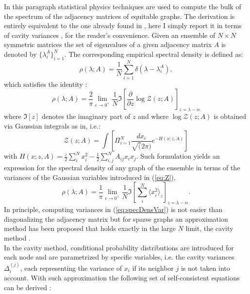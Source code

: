 \documentclass[%
 reprint,
 amsmath,amssymb,
 aps,
 pre,
 showpacs
]{revtex4-1}
\begin{document}
In this paragraph statistical physics techniques are used to compute the bulk of the spectrum of the adjacency matrices of equitable graphs. The derivation is entirely equivalent to the one already found in \cite{newman2014equitable}, here I simply report it in terms of cavity variances \cite{rogers2008cavity}, for the reader's convenience.
Given an ensemble of $N\times N$ symmetric matrices the set of eigenvalues of a given adjacency matrix $A$ is denoted by $\{\lambda_i^A\}_{i=1}^N$. The corresponding empirical spectral density is defined as:
\begin{equation}\label{eq:specDen}
\rho(\lambda;A)=\frac{1}{N}\sum_{i=1}^N\delta(\lambda-\lambda_i^A),
\end{equation}
which satisfies the identity \cite{edwards1976eigenvalue}:
\begin{equation}\label{eq:edwards}
\rho(\lambda;A)=\frac{2}{\pi}\lim_{\epsilon\rightarrow 0^+}\frac{1}{N}\Im\left[\frac{\partial}{\partial z}\log\mathcal{Z}(z;A)\right]_{z=\lambda-i\epsilon}
\end{equation}
where $\Im[z]$ denotes the imaginary part of $z$ and where $\log\mathcal{Z}(z;A)$ is obtained via Gaussian integrals as in\cite{edwards1976eigenvalue}, i.e.: 
\begin{equation}\label{eq:Z}
\mathcal{Z}(z;A)=\int \left[\Pi_{i=1}^N\frac{dx_i}{\sqrt(2\pi)} e^{-H(x;z,A)}\right]
\end{equation}
with $H(x;z,A) = \frac{z}{2}\sum_{i}^N x_i^2  -\frac{1}{2}\sum_{i,j}^N A_{ij}x_ix_j $. Such formulation yields an expression for the spectral density of any graph of the ensemble in terms of the variances of the Gaussian variables introduced in (\ref{eq:Z}), 
\begin{equation}\label{eq:specDensVar}
\rho(\lambda;A)=\frac{1}{\pi}\lim_{\epsilon\rightarrow 0^+}\frac{1}{N}\Im\left[\sum_i^N\langle x_i^2\rangle_z\right]_{z=\lambda-i\epsilon}.
\end{equation}
In principle, computing variances in (\ref{eq:specDensVar}) is not easier than diagonalizing the adjacency matrix but for sparse graphs an approximation method has been proposed that holds exactly in the large $N$ limit, the cavity method \cite{mezard2002analytic,bordenave2010resolvent}.\\
In the cavity method, conditional probability distributions are introduced for each node and are parametrized by specific variables, i.e. the cavity variances $\Delta_i^{(j)}$, each representing the variance of $x_i$ if its neighbor $j$ is not taken into account.
With such approximation the following set of self-consistent equations can be derived \cite{rogers2008cavity}:
\end{document}
